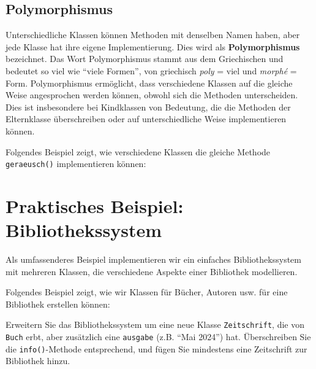 \subsection{Polymorphismus}
Unterschiedliche Klassen können Methoden mit denselben Namen haben, aber jede Klasse hat ihre eigene Implementierung. Dies wird als \textbf{Polymorphismus} bezeichnet. Das Wort Polymorphismus stammt aus dem Griechischen und bedeutet so viel wie \enquote{viele Formen}, von griechisch \textit{poly} = viel und \textit{morphé} = Form. Polymorphismus ermöglicht, dass verschiedene Klassen auf die gleiche Weise angesprochen werden können, obwohl sich die Methoden unterscheiden. Dies ist insbesondere bei Kindklassen von Bedeutung, die die Methoden der Elternklasse überschreiben oder auf unterschiedliche Weise implementieren können.

\begin{myexample}[Polymorphismus] Folgendes Beispiel zeigt, wie verschiedene Klassen die gleiche Methode \lstinline|geraeusch()| implementieren können:
	\leavevmode

\end{myexample}


\section{Praktisches Beispiel: Bibliothekssystem}

Als umfassenderes Beispiel implementieren wir ein einfaches Bibliothekssystem mit mehreren Klassen, die verschiedene Aspekte einer Bibliothek modellieren.

\begin{myexample}[Bibliothekssystem]Folgendes Beispiel zeigt, wie wir Klassen für Bücher, Autoren usw. für eine Bibliothek erstellen können:

\end{myexample}

\begin{myexercise}
	Erweitern Sie das Bibliothekssystem um eine neue Klasse \lstinline|Zeitschrift|, die von \lstinline|Buch| erbt, aber zusätzlich eine \lstinline|ausgabe| (z.B. \enquote{Mai 2024}) hat. Überschreiben Sie die \lstinline|info()|-Methode entsprechend, und fügen Sie mindestens eine Zeitschrift zur Bibliothek hinzu.

	\begin{myanswer}
		
	\end{myanswer}
\end{myexercise}

